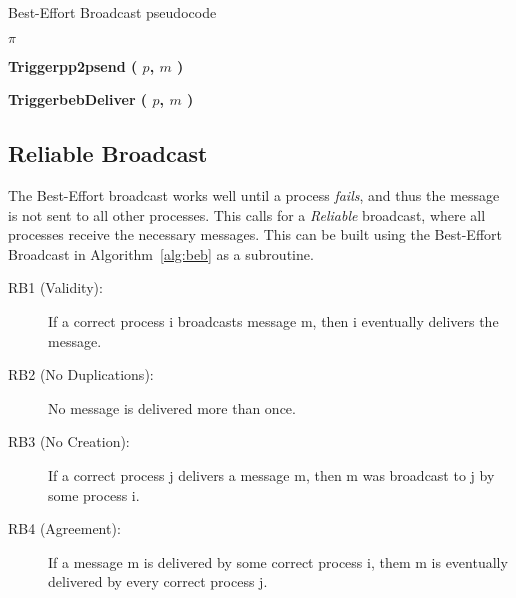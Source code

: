 \documentclass[10pt,a4paper]{article}
\newcommand{\trigger}{\textbf{Trigger}\xspace}
\begin{document}
\begin{algorithm}[h]
	\label{alg:beb}
	\caption{Best-Effort Broadcast pseudocode}
	\begin{algorithmic}
	\item[]
	\Interface
	\EndInterface
	
	\item[]
	\AlgState
	  \State $\pi$ 
	
		\item[]
		\EndUpon
		\item[]
        \State \trigger \textbf{pp2psend ( $p$, $m$ )}
	    \EndFor
		\EndUpon
		\item[]
	    \State \trigger \textbf{bebDeliver ( $p$, $m$ )}
		\EndUpon
	\EndAlgState
	\end{algorithmic}
\end{algorithm}

\newpage

\subsection*{Reliable Broadcast}
The Best-Effort broadcast works well until a process \emph{fails}, and thus the message is not sent to all other processes. This calls for a \emph{Reliable} broadcast, where all processes receive the necessary messages. This can be built using the Best-Effort Broadcast in Algorithm~\ref{alg:beb} as a subroutine.

\begin{description}
  \item[RB1 (Validity):] If a correct process i broadcasts message m, then i eventually delivers the message.
  \item[RB2 (No Duplications):] No message is delivered more than once.
  \item[RB3 (No Creation):] If a correct process j delivers a message m, then m was broadcast to j by some process i. 
  \item[RB4 (Agreement):] If a message m is delivered by some correct process i, them m is eventually delivered by every correct process j.
\end{description}
\end{document}
